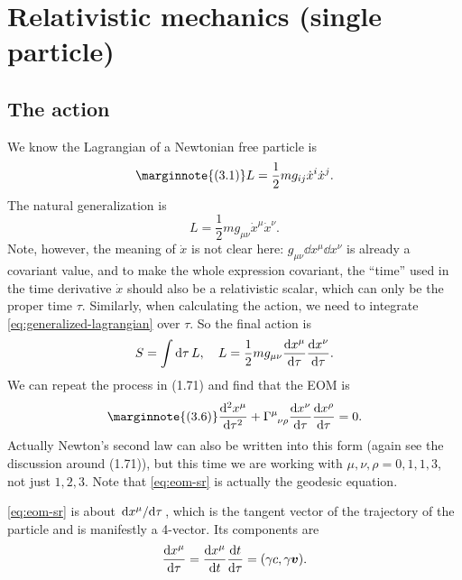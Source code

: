 \documentclass[hyperref, a4paper]{article}
\begin{document}
\section{Relativistic mechanics (single particle)}

\subsection{The action}

We know the Lagrangian of a Newtonian free particle is 
\begin{equation} \marginnote{(3.1)}
    L = \frac{1}{2} m g_{ij} \dot{x}^i \dot{x}^j.
    \label{eq:newton}
\end{equation}
The natural generalization is 
\begin{equation}
    L = \frac{1}{2} m g_{\mu \nu} \dot{x}^\mu \dot{x}^\nu.
    \label{eq:generalized-lagrangian}
\end{equation}
Note, however, the meaning of $\dot{x}$ is not clear here: $g_{\mu \nu} \dd{x^\mu} \dd{x^\nu}$ is already a 
covariant value, and to make the whole expression covariant, the ``time'' used in the time derivative $\dot{x}$
should also be a relativistic scalar, which can only be the proper time $\tau$. Similarly, when calculating 
the action, we need to integrate \eqref{eq:generalized-lagrangian} over $\tau$. So the final action is 
\begin{equation}
    S = \int \dd{\tau} L, \quad L = \frac{1}{2} m g_{\mu \nu} \dv{x^\mu}{\tau} \dv{x^\nu}{\tau}.
    \label{eq:gr-action-1}
\end{equation}
We can repeat the process in (1.71)  and find that the EOM is 
\begin{equation} \marginnote{(3.6)}
    \dv[2]{x^\mu}{\tau} + \Gamma\indices{^\mu_\nu _\rho} \dv{x^\nu}{\tau} \dv{x^\rho}{\tau} = 0.
    \label{eq:eom-sr}
\end{equation}
Actually Newton's second law can also be written into this form (again see the discussion around (1.71)),
but this time we are working with $\mu, \nu, \rho = 0, 1, 1, 3$, not just $1, 2, 3$.
Note that \eqref{eq:eom-sr} is actually the geodesic equation. 

\eqref{eq:eom-sr} is about $\dv*{x^\mu}{\tau}$, which is the tangent vector of the trajectory of the particle
and is manifestly a 4-vector. Its components are 
\begin{equation}
    \dv{x^\mu}{\tau} = \dv{x^\mu}{t} \dv{t}{\tau} = (\gamma c, \gamma \vb*{v}).
    \label{eq:4-velocity-single}
\end{equation}
\end{document}
